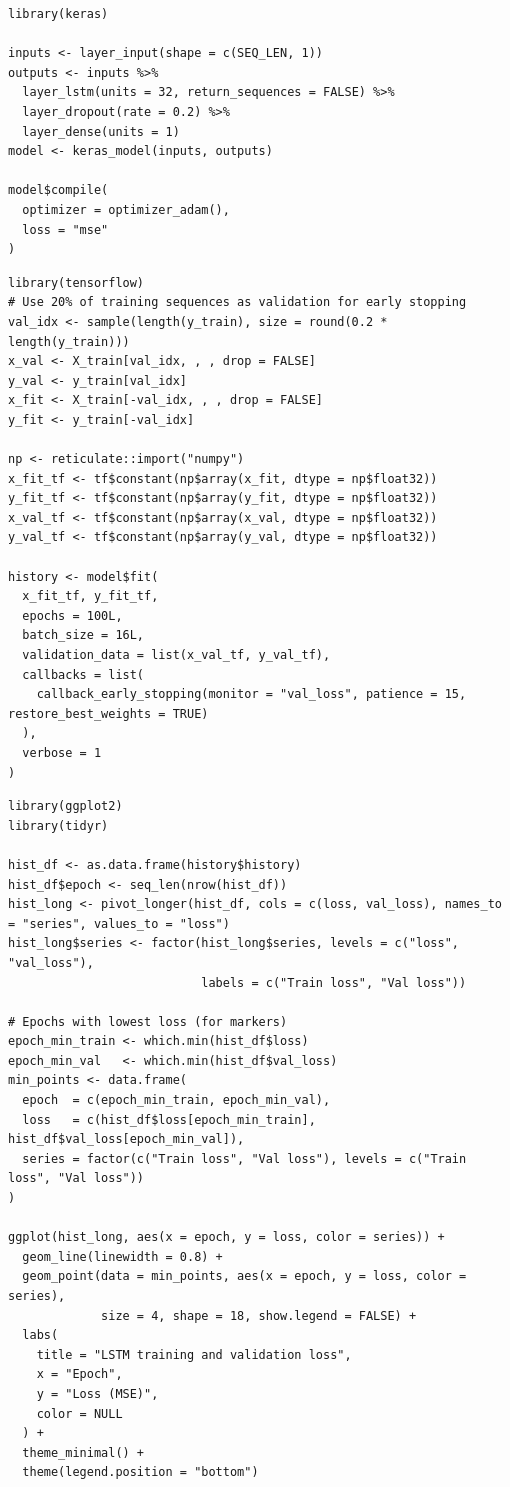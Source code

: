\documentclass[12pt, a4paper]{article}
\begin{document}
\begin{lstlisting}[style=pystyle, caption={LSTM Model}, label=lst:lstm_model]
library(keras)

inputs <- layer_input(shape = c(SEQ_LEN, 1))
outputs <- inputs %>%
  layer_lstm(units = 32, return_sequences = FALSE) %>%
  layer_dropout(rate = 0.2) %>%
  layer_dense(units = 1)
model <- keras_model(inputs, outputs)

model$compile(
  optimizer = optimizer_adam(),
  loss = "mse"
)
\end{lstlisting}

\begin{lstlisting}[style=pystyle, caption={Training the LSTM Model}, label=lst:lstm_training]
library(tensorflow)
# Use 20% of training sequences as validation for early stopping
val_idx <- sample(length(y_train), size = round(0.2 * length(y_train)))
x_val <- X_train[val_idx, , , drop = FALSE]
y_val <- y_train[val_idx]
x_fit <- X_train[-val_idx, , , drop = FALSE]
y_fit <- y_train[-val_idx]

np <- reticulate::import("numpy")
x_fit_tf <- tf$constant(np$array(x_fit, dtype = np$float32))
y_fit_tf <- tf$constant(np$array(y_fit, dtype = np$float32))
x_val_tf <- tf$constant(np$array(x_val, dtype = np$float32))
y_val_tf <- tf$constant(np$array(y_val, dtype = np$float32))

history <- model$fit(
  x_fit_tf, y_fit_tf,
  epochs = 100L,
  batch_size = 16L,
  validation_data = list(x_val_tf, y_val_tf),
  callbacks = list(
    callback_early_stopping(monitor = "val_loss", patience = 15, restore_best_weights = TRUE)
  ),
  verbose = 1
)
\end{lstlisting}

\begin{lstlisting}[style=pystyle, caption={Training and validation loss plot}, label=lst:lstm_loss_plot]
library(ggplot2)
library(tidyr)

hist_df <- as.data.frame(history$history)
hist_df$epoch <- seq_len(nrow(hist_df))
hist_long <- pivot_longer(hist_df, cols = c(loss, val_loss), names_to = "series", values_to = "loss")
hist_long$series <- factor(hist_long$series, levels = c("loss", "val_loss"),
                           labels = c("Train loss", "Val loss"))

# Epochs with lowest loss (for markers)
epoch_min_train <- which.min(hist_df$loss)
epoch_min_val   <- which.min(hist_df$val_loss)
min_points <- data.frame(
  epoch  = c(epoch_min_train, epoch_min_val),
  loss   = c(hist_df$loss[epoch_min_train], hist_df$val_loss[epoch_min_val]),
  series = factor(c("Train loss", "Val loss"), levels = c("Train loss", "Val loss"))
)

ggplot(hist_long, aes(x = epoch, y = loss, color = series)) +
  geom_line(linewidth = 0.8) +
  geom_point(data = min_points, aes(x = epoch, y = loss, color = series),
             size = 4, shape = 18, show.legend = FALSE) +
  labs(
    title = "LSTM training and validation loss",
    x = "Epoch",
    y = "Loss (MSE)",
    color = NULL
  ) +
  theme_minimal() +
  theme(legend.position = "bottom")
\end{lstlisting}
\end{document}
